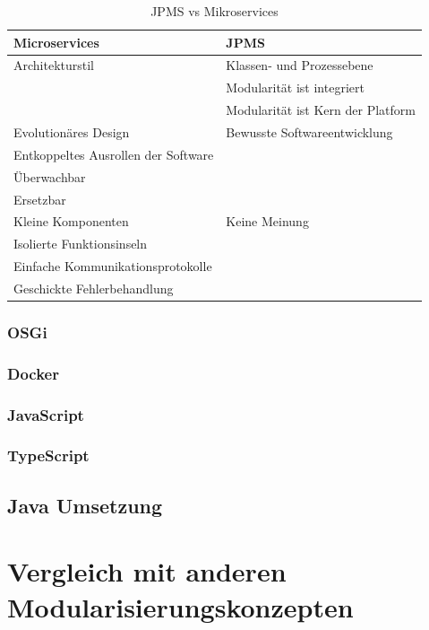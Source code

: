   \begin{table}[h!]
      \label{tab:jpms}
      \begin{tabular}{l|l}
        \textbf{Microservices} & \textbf{JPMS}\\
        \hline
        Architekturstil & Klassen- und Prozessebene \\
        & Modularität ist integriert \\
        & Modularität ist Kern der Platform \\
        \hline
        Evolutionäres Design  & Bewusste Softwareentwicklung \\
        Entkoppeltes Ausrollen der Software &\\
        Überwachbar &\\
        Ersetzbar &\\
        \hline
        Kleine Komponenten & Keine Meinung\\ 
        Isolierte Funktionsinseln &\\
        Einfache Kommunikationsprotokolle&\\
        Geschickte Fehlerbehandlung&\\

      \end{tabular}
      \caption{JPMS vs Mikroservices}
  \end{table}


\subsubsection{OSGi}
\subsubsection{Docker}
\subsubsection{JavaScript}
\subsubsection{TypeScript}
\subsection{Java Umsetzung} 


\section{Vergleich mit anderen Modularisierungskonzepten}


